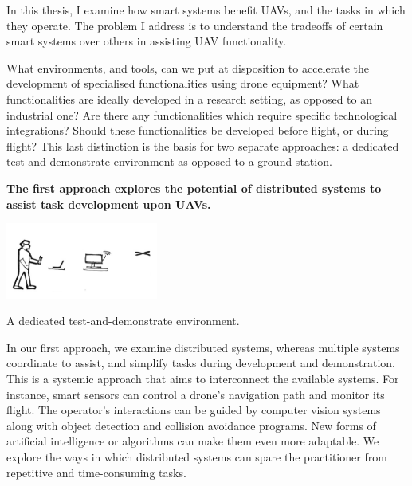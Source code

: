 In this thesis, I examine how smart systems benefit UAVs, and the tasks in which they operate. The problem I address is to understand the tradeoffs of certain smart systems over others in assisting UAV functionality.

What environments, and tools, can we put at disposition to accelerate the development of specialised functionalities using drone equipment? What functionalities are ideally developed in a research setting, as opposed to an industrial one? Are there any functionalities which require specific technological integrations? Should these functionalities be developed before flight, or during flight? This last distinction is the basis for two separate approaches: a dedicated test-and-demonstrate environment as opposed to a ground station.



\textbf{The first approach explores the potential of distributed systems to assist task development upon UAVs.
}
\begin{marginfigure}%
  \includegraphics[width=5cm]{images/intro/step2_diagram.png}
  \caption{A dedicated test-and-demonstrate environment.}
  \label{fig:approachA}
\end{marginfigure}
In our first approach, we examine distributed systems, whereas multiple systems coordinate to assist, and simplify tasks during development and demonstration. This is a systemic approach that aims to interconnect the available systems. For instance, smart sensors can control a drone’s navigation path and monitor its flight. The operator's interactions can be guided by computer vision systems along with object detection and collision avoidance programs. New forms of artificial intelligence or algorithms can make them even more adaptable. We explore the ways in which distributed systems can spare the practitioner from repetitive and time-consuming tasks.

